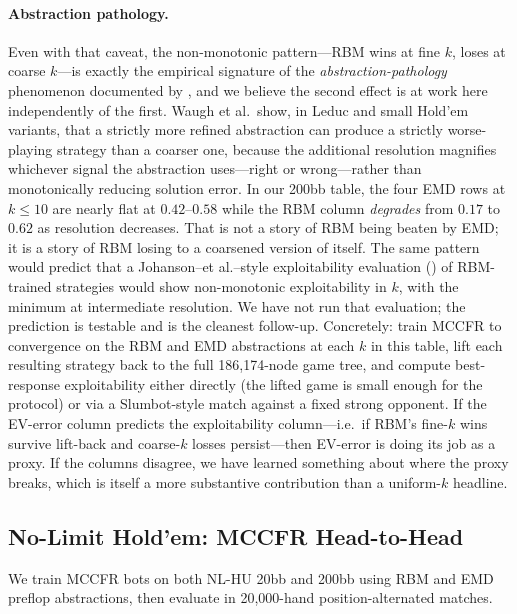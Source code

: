 \documentclass[11pt]{article}
\begin{document}
\paragraph{Abstraction pathology.} Even with that caveat, the
non-monotonic pattern---RBM wins at fine $k$, loses at coarse
$k$---is exactly the empirical signature of the
\emph{abstraction-pathology} phenomenon documented by
\citet{waugh2009abstraction}, and we believe the second effect is at
work here independently of the first. Waugh et al.\ show, in Leduc
and small Hold'em variants, that a strictly more refined abstraction
can produce a strictly worse-playing strategy than a coarser one,
because the additional resolution magnifies whichever signal the
abstraction uses---right or wrong---rather than monotonically
reducing solution error. In our 200bb table, the four EMD rows at
$k \le 10$ are nearly flat at $0.42$--$0.58$ while the RBM column
\emph{degrades} from $0.17$ to $0.62$ as resolution decreases. That
is not a story of RBM being beaten by EMD; it is a story of RBM
losing to a coarsened version of itself. The same pattern would
predict that a Johanson--et al.--style exploitability evaluation
(\citealt{johanson2013evaluating}) of RBM-trained strategies would
show non-monotonic exploitability in $k$, with the minimum at
intermediate resolution. We have not run that evaluation; the
prediction is testable and is the cleanest follow-up. Concretely:
train MCCFR to convergence on the RBM and EMD abstractions at each
$k$ in this table, lift each resulting strategy back to the full
186{,}174-node game tree, and compute best-response exploitability
either directly (the lifted game is small enough for the
\citet{johanson2013evaluating} protocol) or via a Slumbot-style match
against a fixed strong opponent. If the EV-error column predicts
the exploitability column---i.e.\ if RBM's fine-$k$ wins survive
lift-back and coarse-$k$ losses persist---then EV-error is doing
its job as a proxy. If the columns disagree, we have learned
something about where the proxy breaks, which is itself a more
substantive contribution than a uniform-$k$ headline.

\subsection{No-Limit Hold'em: MCCFR Head-to-Head}

We train MCCFR bots on both NL-HU 20bb and 200bb using RBM and EMD
preflop abstractions, then evaluate in 20{,}000-hand
position-alternated matches.
\end{document}
